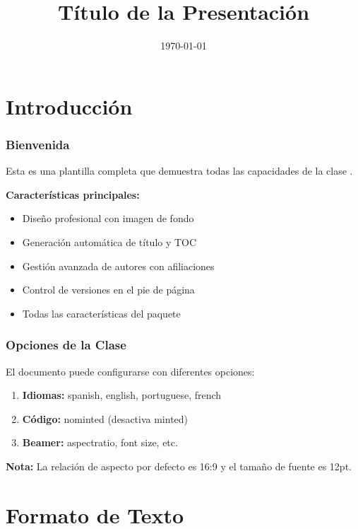 \documentclass{pt-slides}
\title{Título de la Presentación}
\date{\today}
\begin{document}

\section{Introducción}

\begin{frame}
    \frametitle{Bienvenida}

    Esta es una plantilla completa que demuestra todas las capacidades de la clase .

    \vspace{0.5cm}

    \textbf{Características principales:}
    \begin{itemize}
        \item Diseño profesional con imagen de fondo
        \item Generación automática de título y TOC
        \item Gestión avanzada de autores con afiliaciones
        \item Control de versiones en el pie de página
        \item Todas las características del paquete 
    \end{itemize}
\end{frame}

\begin{frame}
    \frametitle{Opciones de la Clase}

    El documento puede configurarse con diferentes opciones:

    \begin{enumerate}
        \item \textbf{Idiomas:} spanish, english, portuguese, french
        \item \textbf{Código:} nominted (desactiva minted)
        \item \textbf{Beamer:} aspectratio, font size, etc.
    \end{enumerate}

    \vspace{0.5cm}

    \begin{highlightbox}
        \textbf{Nota:} La relación de aspecto por defecto es 16:9 y el tamaño de fuente es 12pt.
    \end{highlightbox}
\end{frame}

\section{Formato de Texto}
\end{document}
